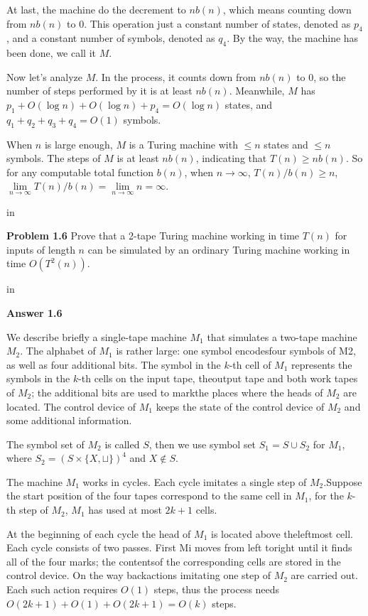 \documentclass[11pt]{article}
\begin{document}
At last, the machine do the decrement to $nb(n)$, which means counting down from $nb(n)$ to $0$. This operation just a constant number of states, denoted as $p_4$, and a constant number of
symbols, denoted as $q_4$. By the way, the machine has been done, we call it $M$.

Now let’s analyze $M$. In the process, it counts down from $nb(n)$ to $0$, so the number
of steps performed by it is at least $nb(n)$. Meanwhile, $M$ has $p_1+O(\log n)+O(\log n)+p_4 = O(\log n)$ states, and $q_1 +q_2 +q_3 +q_4 = O(1)$ symbols. 

When $n$ is large enough, $M$ is a Turing machine with $\leq n$ states and $\leq n$ symbols. The steps of $M$ is at least $nb(n)$, indicating that $T(n) \geq nb(n)$. So for any computable total function $b(n)$, when $n\to\infty $, $T(n)/b(n) \geq n$,$\lim\limits_{n\to\infty}T(n)/b(n) = \lim\limits_{n\to\infty}n = \infty$.

 in

\newpage
{\bf Problem 1.6} Prove that a 2-tape Turing machine working in time $T(n)$ for inputs of length $n$ can be simulated by an ordinary Turing machine working in time $O(T^2(n))$.

 in

{\bf Answer 1.6 }

We describe briefly a single-tape machine $M_1$ that simulates a two-tape machine $M_2$. The alphabet of $M_1$ is rather large: one symbol encodesfour symbols of M2, as well as four additional bits. The symbol in the $k$-th cell of $M_1$ represents the symbols in the $k$-th cells on the input tape, theoutput tape and both work tapes of $M_2$; the additional bits are used to markthe places where the heads of $M_2$ are located. The control device of $M_1$ keeps the state of the control device of $M_2$ and some additional information.

The symbol set of $M_2$ is called $S$, then we use symbol set $S_1=S\cup S_2$ for $M_1$, where $S_2=(S\times\{X,\sqcup\})^4$ and $X\notin S$.

The machine $M_1$ works in cycles. Each cycle imitates a single step of $M_2$.Suppose the start position of the four tapes correspond to the same cell in $M_1$, for the $k$-th step of $M_2$, $M_1$ has used at most $2k + 1$ cells.

At the beginning of each cycle the head of $M_1$ is located above theleftmost cell. Each cycle consists of two passes. First Mi moves from left toright until it finds all of the four marks; the contentsof the corresponding cells are stored in the control device. On the way backactions imitating one step of $M_2$ are carried out. Each such action requires $O(1)$ steps, thus the process needs $O(2k + 1) + O(1) + O(2k + 1) = O(k)$ steps.
\end{document}
